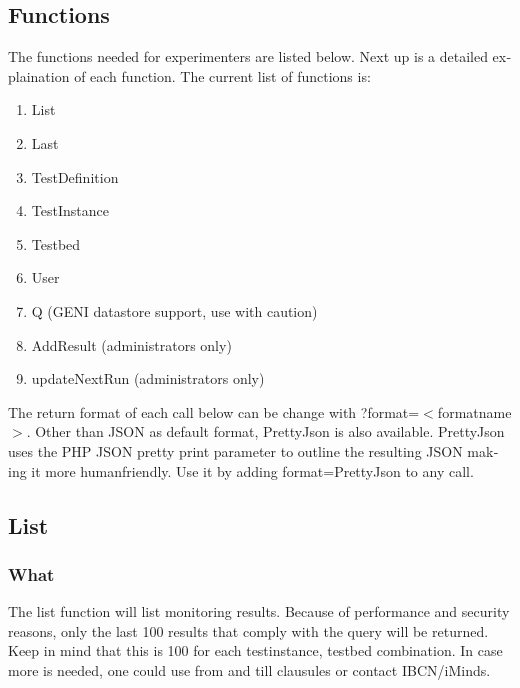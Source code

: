 \begin{otherlanguage}{english}
\section{Functions}
The functions needed for experimenters are listed below. Next up is a detailed explaination of each function. The current list of functions is:
\begin{enumerate}
\item List
\item Last
\item TestDefinition
\item TestInstance
\item Testbed
\item User
\item Q (GENI datastore support, use with caution)
\item AddResult (administrators only)
\item updateNextRun (administrators only)
\end{enumerate}
\npar
The return format of each call below can be change with ?format=$<$formatname$>$. 
Other than JSON as default format, PrettyJson is also available. PrettyJson uses the PHP JSON pretty print parameter to outline the resulting JSON making it more humanfriendly.
Use it by adding format=PrettyJson to any call.

\subsection{List}
\subsubsection{What}
The list function will list monitoring results. Because of performance and security reasons, only the last 100 results that comply with the query will be returned. Keep in mind that this is 100 for each testinstance, testbed combination. In case more is needed, one could use from and till clausules or contact IBCN/iMinds.

\clearpage


\end{otherlanguage}
